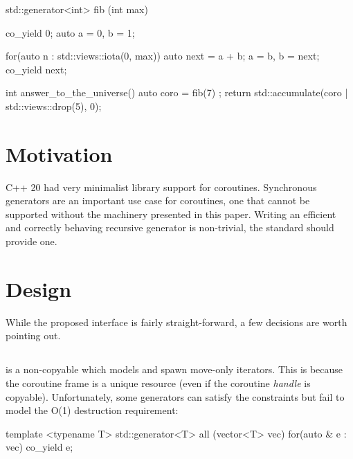 \documentclass{wg21}
\begin{document}
\begin{colorblock}
    std::generator<int> fib (int max) {
        co_yield 0;
        auto a = 0, b = 1;
        
        for(auto n : std::views::iota(0, max))  {
            auto next = a + b;
            a = b, b = next;
            co_yield next;
        }
    }
    
    int answer_to_the_universe() {
        auto coro = fib(7) ;
        return std::accumulate(coro | std::views::drop(5), 0);
    }
    
\end{colorblock}

\section{Motivation}

C++ 20 had very minimalist library support for coroutines.
Synchronous generators are an important use case for coroutines, one that cannot be supported without 
the machinery presented in this paper.
Writing an efficient and correctly behaving recursive generator is non-trivial, the standard should provide one.


\section{Design}

While the proposed  interface is fairly straight-forward, a few decisions are worth pointing out.

\subsection{}

 is a non-copyable  which models  and spawn move-only iterators.
This is because the coroutine frame is a unique resource (even if the coroutine \textit{handle} is copyable).
Unfortunately, some generators can satisfy the  constraints but fail to model the  O(1) 
destruction requirement:

\begin{colorblock}
    
    template <typename T>
    std::generator<T> all (vector<T> vec) {
        for(auto & e : vec)  {
            co_yield e;
        }
    }
    
\end{colorblock}
\end{document}
